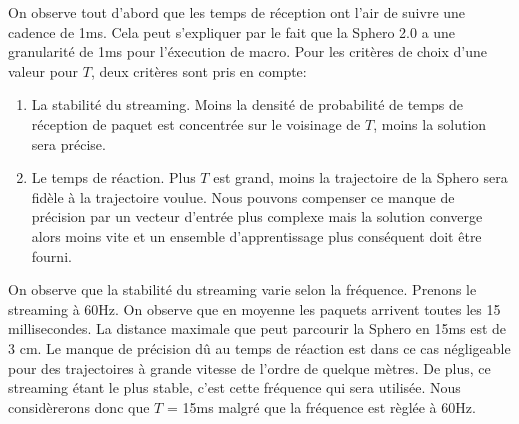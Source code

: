 On observe tout d'abord que les temps de réception ont l'air de suivre une cadence de 1ms.
Cela peut s'expliquer par le fait que la Sphero 2.0 a une granularité de 1ms pour l'éxecution de macro\cite{product}.
Pour les critères de choix d'une valeur pour $T$, deux critères sont pris en compte:
\begin{enumerate}
 \item La stabilité du streaming. Moins la densité de probabilité de temps de réception de paquet est concentrée sur le voisinage de $T$, moins la solution sera précise.
 \item Le temps de réaction. Plus $T$ est grand, moins la trajectoire de la Sphero sera fidèle à la trajectoire voulue.
 Nous pouvons compenser ce manque de précision par un vecteur d'entrée plus complexe mais la solution converge alors moins vite et un ensemble d'apprentissage plus conséquent doit être fourni.
\end{enumerate}

On observe que la stabilité du streaming varie selon la fréquence.
Prenons le streaming à 60Hz. On observe que en moyenne les paquets arrivent toutes les 15 millisecondes.
La distance maximale que peut parcourir la Sphero en 15ms est de 3 cm.
Le manque de précision dû au temps de réaction est dans ce cas négligeable pour des trajectoires à grande vitesse de l'ordre de quelque mètres.
De plus, ce streaming étant le plus stable, c'est cette fréquence qui sera utilisée.
Nous considèrerons donc que $T$ = 15ms malgré que la fréquence est règlée à 60Hz.
